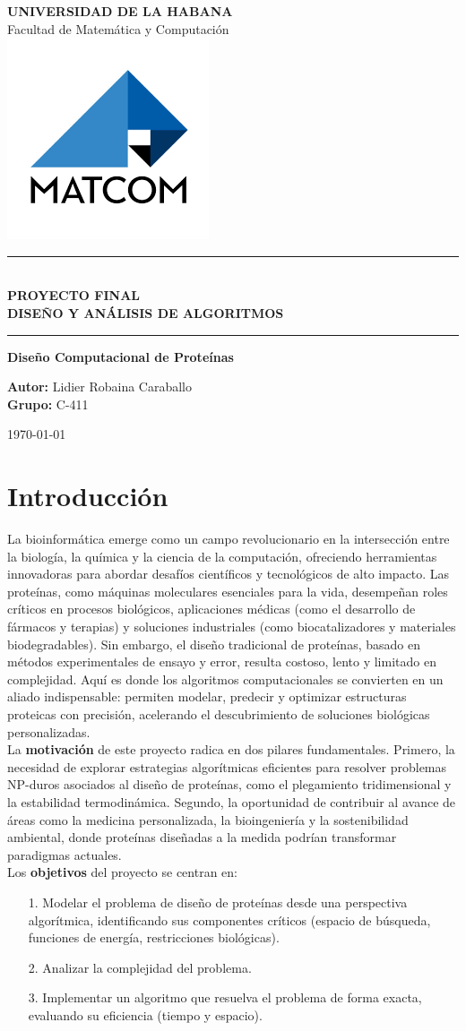 \documentclass[letterpaper, 12pt]{report}
\newcommand*{\customtitlepage}{
    \begin{titlepage}
        \begin{center}
            \vspace*{1cm}
            
            
            {\LARGE \textbf{UNIVERSIDAD DE LA HABANA}}\\
            \vspace{0.5cm}
            {\Large Facultad de Matem\'atica y Computaci\'on}\\
            

            \includegraphics[scale=0.5]{images/logo.png}
            
            \vspace{1cm}
            
            
            \rule{\textwidth}{1.5pt}\\
            \vspace{0.5cm}
            {\LARGE \textcolor{primary}{\textbf{PROYECTO FINAL}}}\\
            {\LARGE \textcolor{primary}{\textbf{DISE\~NO Y AN\'ALISIS DE ALGORITMOS}}}
            \vspace{0.5cm}
            \rule{\textwidth}{1.5pt}
            
            \vspace{2cm}
            
            {\Large \textbf{Diseño Computacional de Prote\'inas}}\\
            \vspace{1cm}
            
            {\Large \textbf{Autor:} Lidier Robaina Caraballo \\
            \vspace{0.5cm}
            {\Large \textbf{Grupo:} C-411 }\\
            \vspace{1.5cm}
            
            {\Large \today}
            }
        \end{center}
    \end{titlepage}
}
\begin{document}
\customtitlepage

\tableofcontents
\thispagestyle{empty}
\cleardoublepage

\setcounter{page}{1}

\chapter{Introducción}

La bioinform\'atica emerge como un campo revolucionario en la intersección entre la biología, la química y la ciencia de la computación, ofreciendo herramientas innovadoras para abordar desafíos científicos y tecnológicos de alto impacto. Las proteínas, como máquinas moleculares esenciales para la vida, desempeñan roles críticos en procesos biológicos, aplicaciones médicas (como el desarrollo de fármacos y terapias) y soluciones industriales (como biocatalizadores y materiales biodegradables). Sin embargo, el diseño tradicional de proteínas, basado en métodos experimentales de ensayo y error, resulta costoso, lento y limitado en complejidad. Aquí es donde los algoritmos computacionales se convierten en un aliado indispensable: permiten modelar, predecir y optimizar estructuras proteicas con precisión, acelerando el descubrimiento de soluciones biológicas personalizadas.  \\

La \textbf{motivación} de este proyecto radica en dos pilares fundamentales. Primero, la necesidad de explorar estrategias algorítmicas eficientes para resolver problemas NP-duros asociados al diseño de proteínas, como el plegamiento tridimensional y la estabilidad termodinámica. Segundo, la oportunidad de contribuir al avance de áreas como la medicina personalizada, la bioingeniería y la sostenibilidad ambiental, donde proteínas diseñadas a la medida podrían transformar paradigmas actuales. \\

Los \textbf{objetivos} del proyecto se centran en:
\begin{itemize}
    \item[1.] Modelar el problema de diseño de proteínas desde una perspectiva algorítmica, identificando sus componentes críticos (espacio de búsqueda, funciones de energía, restricciones biológicas).  
    \item[2.] Analizar la complejidad del problema.
    \item[3.] Implementar un algoritmo que resuelva el problema de forma exacta, evaluando su eficiencia (tiempo y espacio).   
\end{itemize}
\end{document}
